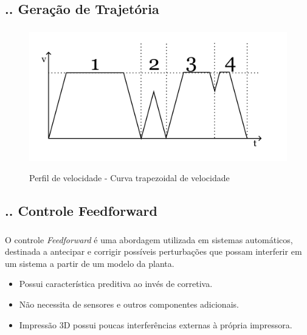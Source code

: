 \documentclass[aspectratio=169]{beamer}
\begin{document}
\subsection{\insertsectionnumber .\insertsubsectionnumber . Geração de Trajetória}
\begin{frame}
  \frametitle{\insertsubsection}
  \begin{figure}[H]
    \centering
    \caption{Perfil de velocidade - Curva trapezoidal de velocidade}
    \includegraphics[scale=0.5]{trap_triang}
    \label{fig:trap_triang}
  \end{figure}
\end{frame}

\subsection{\insertsectionnumber .\insertsubsectionnumber . Controle Feedforward}
\begin{frame}
  \frametitle{\insertsubsection}
  O controle \textit{Feedforward} é uma abordagem utilizada em sistemas automáticos, destinada a antecipar e corrigir possíveis perturbações que possam interferir em um sistema a partir de um modelo da planta.
  \begin{itemize}
    \item Possui característica preditiva ao invés de corretiva.
    \item Não necessita de sensores e outros componentes adicionais.
    \item Impressão 3D possui poucas interferências externas à própria impressora.
  \end{itemize}
\end{frame}
\end{document}
